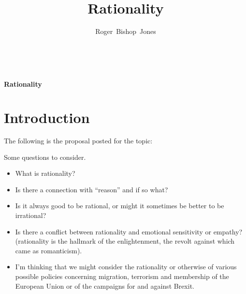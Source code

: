 \documentclass[14pt,titlepage]{extarticle}
\title{Rationality}
\author{Roger~Bishop~Jones}
\date{\ }
\begin{document}

                               
\begin{titlepage}
\maketitle





\end{titlepage}

\begin{centering}
{\LARGE \bf Rationality}
\end{centering}

\setcounter{tocdepth}{1}
{\parskip-0pt\tableofcontents}




\section{Introduction}

The following is the proposal posted for the topic:

Some questions to consider.

\begin{itemize}
\item What is rationality?
\item Is there a connection with ``reason'' and if so what?
\item Is it always good to be rational, or might it sometimes be better to be
irrational?
\item Is there a conflict between rationality and emotional sensitivity or
empathy?
(rationality is the hallmark of the enlightenment, the revolt against
which came as romanticism).
\item I'm thinking that we might consider the rationality or otherwise of various
possible policies concerning migration, terrorism and membership of the
European Union or of the campaigns for and against Brexit.
\end{itemize}
\end{document}
